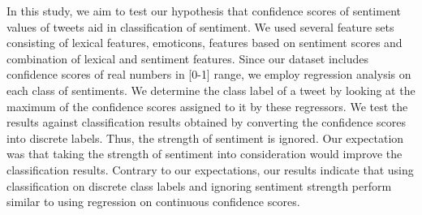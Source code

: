 In this study, we aim to test our hypothesis that confidence scores of sentiment values of tweets aid in classification of sentiment. We used several feature sets consisting of lexical features, emoticons, features based on sentiment scores and combination of lexical and sentiment features. Since our dataset includes confidence scores of real numbers in [0-1] range, we employ regression analysis on each class of sentiments. We determine the class label of a tweet by looking at the maximum of the confidence scores assigned to it by these regressors. We test the results against classification results obtained by converting the confidence scores into discrete labels. Thus, the strength of sentiment is ignored. Our expectation was that taking the strength of sentiment into consideration would improve the classification results. Contrary to our expectations, our results indicate that using classification on discrete class labels and ignoring sentiment strength perform similar to using regression on continuous confidence scores.
